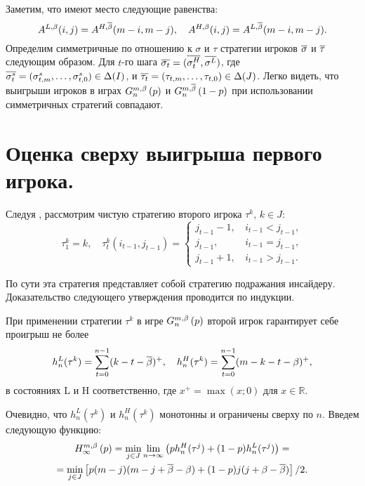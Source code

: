 Заметим, что имеют место следующие равенства:
\begin{equation*}
  A^{L,\Co}(i, j) = A^{H,\DCo}(m-i, m-j), \quad
  A^{H,\Co}(i, j) = A^{L,\DCo}(m-i, m-j).
\end{equation*}
Определим симметричные по отношению к $\sigma$ и $\tau$ стратегии игроков
$\symm{\sigma}$ и $\symm{\tau}$ следующим образом. Для $t$-го шага
$\symm{\sigma_t} = (\symm{\sigma^H_t}, \symm{\sigma^L})$, где
$\symm{\sigma^s_t}=(\sigma^s_{t,m},\ldots,\sigma^s_{t,0}) \in \Delta(I)$, и
$\symm{\tau_t} = (\tau_{t,m},\ldots,\tau_{t,0}) \in \Delta(J)$. Легко видеть,
что выигрыши игроков в играх $\generalGame{n}{p}$ и
$\symmGameExpression[n]{1-p}$ при использовании симметричных стратегий
совпадают.

\section{Оценка сверху выигрыша первого игрока.}
Следуя \cite{domansky07}, рассмотрим чистую стратегию второго игрока $\tau^k, \,
k \in J$:
\[
  \tau^k_1 = k, \quad \tau^k_t(i_{t-1}, j_{t-1}) = \begin{cases}
    j_{t-1} - 1, & \, i_{t-1} < j_{t-1}, \\
    j_{t-1},     & \, i_{t-1} = j_{t-1}, \\
    j_{t-1} + 1, & \, i_{t-1} > j_{t-1}.
  \end{cases}
\]

По сути эта стратегия представляет собой стратегию подражания инсайдеру.
Доказательство следующего утверждения проводится по индукции.

\begin{proposition}
  \label{proposition:secondPlayerStrategyPayoffs}
  При применении стратегии $\tau^k$ в игре $\generalGame{n}{p}$ второй игрок
  гарантирует себе проигрыш не более
  \[
    h_n^L(\tau^k) = \sum_{t=0}^{n-1}(k - t - \DCo)^+, \quad h_n^H(\tau^k) =
    \sum_{t=0}^{n-1}(m - k - t - \Co)^+,
  \]
  в состояниях L и H соответственно, где $x^+ = \max(x; 0)$ для $x \in
  \mathbb{R}$.
\end{proposition}

Очевидно, что $h_n^L(\tau^k)$ и $h_n^H(\tau^k)$ монотонны и ограничены сверху по
$n$. Введем следующую функцию:
\begin{multline*}
  \upperBound{p} = \min_{j \in J} \lim_{n \rightarrow \infty}\left(
    ph_n^H(\tau^j) + (1-p)h_n^L(\tau^j)
  \right) = \\
  = \min_{j \in J} \left[ p (m - j)(m - j + \DCo - \Co) + (1 - p)j(j + \Co
    - \DCo) \right] / 2.
\end{multline*}


